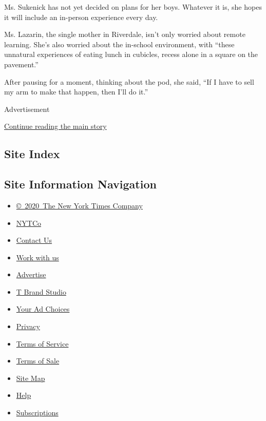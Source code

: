Ms. Sukenick has not yet decided on plans for her boys. Whatever it is,
she hopes it will include an in-person experience every day.

Ms. Lazarin, the single mother in Riverdale, isn't only worried about
remote learning. She's also worried about the in-school environment,
with ``these unnatural experiences of eating lunch in cubicles, recess
alone in a square on the pavement.''

After pausing for a moment, thinking about the pod, she said, ``If I
have to sell my arm to make that happen, then I'll do it.''

Advertisement

\protect\hyperlink{after-bottom}{Continue reading the main story}

\hypertarget{site-index}{%
\subsection{Site Index}\label{site-index}}

\hypertarget{site-information-navigation}{%
\subsection{Site Information
Navigation}\label{site-information-navigation}}

\begin{itemize}
\tightlist
\item
  \href{https://help.nytimes3xbfgragh.onion/hc/en-us/articles/115014792127-Copyright-notice}{©~2020~The
  New York Times Company}
\end{itemize}

\begin{itemize}
\tightlist
\item
  \href{https://www.nytco.com/}{NYTCo}
\item
  \href{https://help.nytimes3xbfgragh.onion/hc/en-us/articles/115015385887-Contact-Us}{Contact
  Us}
\item
  \href{https://www.nytco.com/careers/}{Work with us}
\item
  \href{https://nytmediakit.com/}{Advertise}
\item
  \href{http://www.tbrandstudio.com/}{T Brand Studio}
\item
  \href{https://www.nytimes3xbfgragh.onion/privacy/cookie-policy\#how-do-i-manage-trackers}{Your
  Ad Choices}
\item
  \href{https://www.nytimes3xbfgragh.onion/privacy}{Privacy}
\item
  \href{https://help.nytimes3xbfgragh.onion/hc/en-us/articles/115014893428-Terms-of-service}{Terms
  of Service}
\item
  \href{https://help.nytimes3xbfgragh.onion/hc/en-us/articles/115014893968-Terms-of-sale}{Terms
  of Sale}
\item
  \href{https://spiderbites.nytimes3xbfgragh.onion}{Site Map}
\item
  \href{https://help.nytimes3xbfgragh.onion/hc/en-us}{Help}
\item
  \href{https://www.nytimes3xbfgragh.onion/subscription?campaignId=37WXW}{Subscriptions}
\end{itemize}

